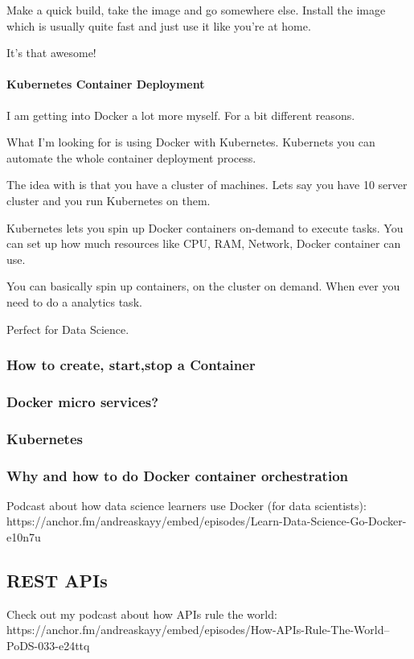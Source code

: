 \documentclass[12pt]{scrartcl} %
\begin{document}
Make a quick build, take the image and go somewhere else. Install the image which is usually quite fast and just use it like you’re at home.

It’s that awesome!

\paragraph{Kubernetes Container Deployment}

I am getting into Docker a lot more myself. For a bit different reasons.

What I’m looking for is using Docker with Kubernetes. Kubernets you can automate the whole container deployment process.

The idea with is that you have a cluster of machines. Lets say you have 10 server cluster and you run Kubernetes on them.

Kubernetes lets you spin up Docker containers on-demand to execute tasks. You can set up how much resources like CPU, RAM, Network, Docker container can use.

You can basically spin up containers, on the cluster on demand. When ever you need to do a analytics task.

Perfect for Data Science.
\subsubsection{How to create, start,stop a Container}
\subsubsection{Docker micro services?}
\subsubsection{Kubernetes}
\subsubsection{Why and how to do Docker container orchestration}
Podcast about how data science learners use Docker (for data scientists): https://anchor.fm/andreaskayy/embed/episodes/Learn-Data-Science-Go-Docker-e10n7u





\subsection{REST APIs}
Check out my podcast about how APIs rule the world: https://anchor.fm/andreaskayy/embed/episodes/How-APIs-Rule-The-World--PoDS-033-e24ttq
\end{document}
